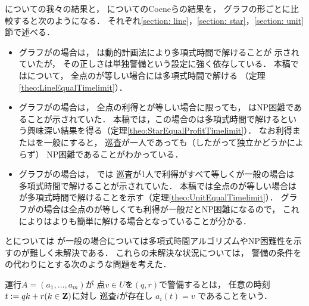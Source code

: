 {\patProb}についての我々の結果と，
{\independentPatProb}についてのCoeneらの結果を，
グラフの形ごとに比較すると次のようになる．
それぞれ\ref{section: line}，\ref{section: star}，\ref{section: unit}節で述べる．
\begin{itemize}
  \item 
    グラフが{\graphLine}の場合は，
    {\independentPatProb}は動的計画法により多項式時間で解けることが
    示されていた\cite[Theorem~11]{coene2011charlemagne}が，
    その正しさは単独警備という設定に強く依存している．
    本稿では{\patProb}について，
    全点の{\idletime}が等しい場合には多項式時間で解ける
    （定理\ref{theo:LineEqualTimelimit}）．
  \item
    グラフが{\graphStar}の場合は，
    全点の利得と{\idletime}が等しい場合に限っても，
    {\independentPatProb}はNP困難であることが示されていた\cite[Theorem~10]{coene2011charlemagne}．
    本稿では，この場合の{\patProb}は多項式時間で解けるという興味深い結果を得る（定理\ref{theo:StarEqualProfitTimelimit}）．
    なお利得または{\idletime}を一般にすると，
    巡査が一人であっても（したがって独立かどうかによらず）
    NP困難であることがわかっている\cite[Theorems 5 and 6]{coene2011charlemagne}．
  \item 
    グラフが{\graphUnit}の場合は，
    {\independentPatProb}では
    巡査が1人で利得がすべて等しく{\idletime}が一般の場合は
    多項式時間で解けることが示されていた\cite[Theorem~7]{coene2011charlemagne}．
    本稿では全点の{\idletime}が等しい場合は{\patProb}が多項式時間で解けることを示す（定理\ref{theo:UnitEqualTimelimit}）．
    グラフが{\graphStar}の場合は全点の{\idletime}が等しくても利得が一般だとNP困難になるので，
    これにより{\graphUnit}は{\graphStar}よりも簡単に解ける場合となっていることが分かる．
\end{itemize}


{\graphLine}と{\graphUnit}については
{\idletime}が一般の場合については多項式時間アルゴリズムやNP困難性を示すのが難しく未解決である．
これらの未解決な状況については，
警備の条件を{\idletime}の代わりに{\exactidletime}とする次のような問題を考えた．

\begin{defi}
  運行$A = (a _1, \ldots, a _m)$が
  点$v \in U$を{\exactidletime}$(q, r)$で警備するとは，
  任意の時刻$t := q k + r (k \in \mathbf Z)$に対し
  巡査$i$が存在し
  $a _i (t) = v$
  であることをいう．
\end{defi}

